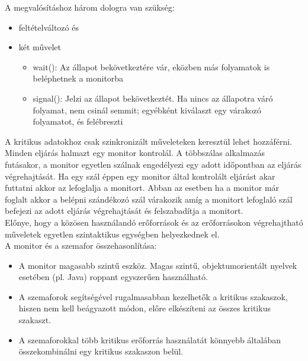 \documentclass[tikz,12pt,margin=0px]{article}
\begin{document}
    \noindent A megvalósításhoz három dologra van szükség:

    \begin{itemize}[topsep=8pt,itemsep=4pt,partopsep=4pt, parsep=4pt]
        \item feltételváltozó és
        \item két művelet
        \begin{itemize}
            \item wait(): Az állapot bekövetkeztére vár, eközben más folyamatok is beléphetnek a monitorba
            \item signal(): Jelzi az állapot bekövetkeztét. Ha nincs az állapotra váró folyamat, nem csinál semmit; egyébként kiválaszt egy várakozó folyamatot, és felébreszti
        \end{itemize}
    \end{itemize}

    \noindent A  kritikus  adatokhoz  csak  szinkronizált  műveleteken keresztül lehet hozzáférni.\\

    \noindent Minden eljárás halmazt egy monitor kontrolál. A többszálas alkalmazás futásakor, a monitor egyetlen szálnak engedélyezi egy adott időpontban az eljárás végrehajtását. Ha egy szál  éppen egy monitor által kontrolált eljárást akar futtatni akkor az lefoglalja a monitort. Abban az esetben ha a monitor már foglalt akkor a belépni szándékozó szál várakozik amíg  a monitort lefoglaló szál befejezi az adott eljárás végrehajtását és felszabadítja a monitort.\\

    \noindent Előnye, hogy a közösen használandó erőforrások és az erőforrásokon végrehajtható műveletek egyetlen szintaktikus egységben helyezkednek el.\\

    \noindent A monitor és a szemafor összehasonlítása:
    \begin{itemize}[topsep=8pt,itemsep=4pt,partopsep=4pt, parsep=4pt]
        \item A monitor magasabb szintű eszköz. Magas szintű, objektumorientált nyelvek esetében (pl. Java) roppant egyszerűen használható.
        \item A szemaforok segítségével rugalmasabban kezelhetők a kritikus szakaszok, hiszen nem kell beágyazott módon, előre elkészíteni az összes kritikus szakaszt.
        \item A szemaforokkal több kritikus erőforrás használatát könnyebb általában összekombinálni egy kritikus szakaszon belül.
    \end{itemize}
\end{document}
